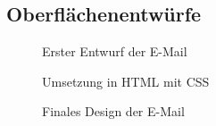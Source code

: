 \subsection{Oberflächenentwürfe}
\label{app:Entwuerfe}
\begin{figure}[htb]
\centering
{}
\caption{Erster Entwurf der E-Mail}
\end{figure}

\begin{figure}[htb]
\centering
{}
\caption{Umsetzung in HTML mit CSS}
\end{figure}

\begin{figure}[htb]
\centering
{}
\caption{Finales Design der E-Mail}
\label{app:finalDesign}
\end{figure}
